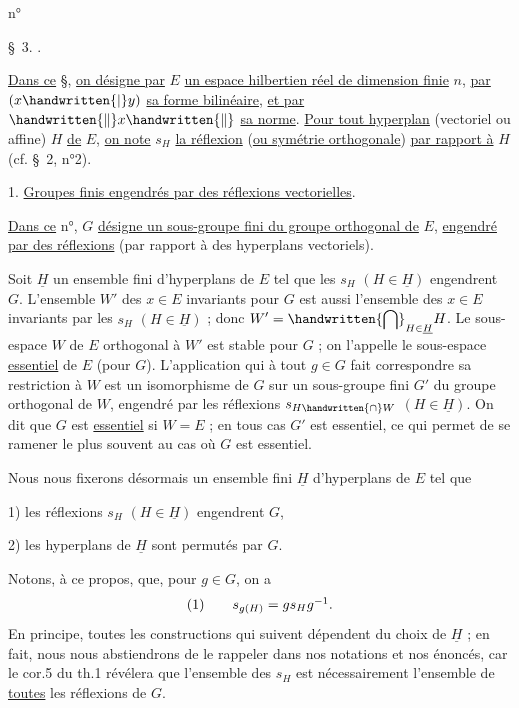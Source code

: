 \begin{flushright}n° \end{flushright}
\begin{center}\S\ 3. .\end{center}

\uline{Dans ce} \S, \uline{on désigne par} $E$ \uline{un espace hilbertien réel de dimension finie} $n$, \uline{par} $(x\handwritten{|}y)$ \uline{sa forme bilinéaire}, \uline{et par} $\handwritten{\lVert}x\handwritten{\rVert}$ \uline{sa norme}. \uline{Pour tout hyperplan} (vectoriel ou affine) $H$ \uline{de} $E$, \uline{on note} $s_H$ \uline{la réflexion} (\uline{ou symétrie orthogonale}) \uline{par rapport à} $H$ (cf. \S\ 2, n°2).

1. \uline{Groupes finis engendrés par des réflexions vectorielles}.

\uline{Dans ce} n°, $G$ \uline{désigne un sous-groupe fini du groupe orthogonal de} $E$, \uline{engendré par des réflexions} (par rapport à des hyperplans vectoriels).

Soit $\underline{H}$ un ensemble fini d'hyperplans de $E$ tel que les $s_H$ $(H\in\underline{H})$ engendrent $G$. L'ensemble $W'$ des $x\in E$ invariants pour $G$ est aussi l'ensemble des $x\in E$ invariants par les $s_H$ $(H\in\underline{H})$ ; donc $\displaystyle W'=\handwritten{\bigcap}_{H\in\underline{H}}H$. Le sous-espace $W$ de $E$ orthogonal à $W'$ est stable pour $G$ ; on l'appelle le sous-espace \uline{essentiel} de $E$ (pour $G$). L'application qui à tout $g\in G$ fait correspondre sa restriction à $W$ est un isomorphisme de $G$ sur un sous-groupe fini $G'$ du groupe orthogonal de $W$, engendré par les réflexions $s_{H\handwritten{\cap}W}$ $(H\in\underline{H})$. On dit que $G$ est \uline{essentiel} si $W=E$ ; en tous cas $G'$ est essentiel, ce qui permet de se ramener le plus souvent au cas où $G$ est essentiel.

Nous nous fixerons désormais un ensemble fini $\underline{H}$ d'hyperplans de $E$ tel que

1) les réflexions $s_H$ $(H\in\underline{H})$ engendrent $G$,

2) les hyperplans de $\underline{H}$ sont permutés par $G$.

Notons, à ce propos, que, pour $g\in G$, on a
\[
\begin{array}{l@{\qquad}l}(1)&s_{g(H)}=gs_Hg^{-1}.\end{array}
\]
En principe, toutes les constructions qui suivent dépendent du choix de $\underline{H}$ ; en fait, nous nous abstiendrons de le rappeler dans nos notations et nos énoncés, car le cor.5 du th.1 révélera que l'ensemble des $s_H$ est nécessairement l'ensemble de \uline{toutes} les réflexions de $G$.
